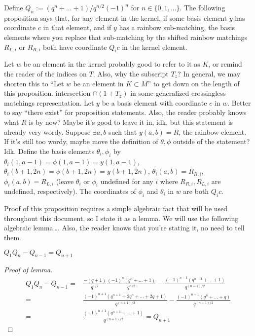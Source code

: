 \documentclass{amsart}
\begin{document}
Define $Q_n:=(q^n+...+1)/q^{n/2}(-1)^n$ for $n\in \{0,1,...\}$. The following proposition says that, for any element in the kernel, if some basis element $y$ has coordinate $c$ in that element, and if $y$ has a rainbow sub-matching, the basis elements where you replace that sub-matching by the shifted rainbow matchings $R_{L,i}$ or $R_{R,i}$ both have coordinate $Q_ic$ in the kernel element.

\begin{proposition}
  Let $w$ be an element in the kernel 
  {\color{magenta} probably good to refer to it as $K$, or remind the reader of the indices on $T$. Also, why the subscript $T_z$?
  In general, we may shorten this to ``Let $w$ be an element in $K \subset M$'' to get down on the length of this proposition.
}
  intersection $\cap (1+T_z)$ in some generalized crossingless matchings representation. Let $y$ be a basis element with coordinate $c$ in $w$. 
  {\color{magenta} Better to say ``there exist'' for proposition statements.
  Also, the reader probably knows what $R$ is by now? Maybe it's good to leave it in, idk, but this statement is already very wordy.
}
  Suppose $\exists a,b$ such that $y(a,b)=R$, the rainbow element. 
  {\color{magenta} If it's still too wordy, maybe move the definition of $\theta,\phi$ outside of the statement? Idk.}
  Define the basis elements $\theta_i,\phi_i$ by $\theta_i(1,a-1)=\phi(1,a-1)=y(1,a-1)$, $\theta_i(b+1,2n)=\phi(b+1,2n)=y(b+1,2n)$, $\theta_i(a,b)=R_{R,i}$, $\phi_i(a,b)=R_{L,i}$ (leave $\theta_i$ or $\phi_i$ undefined for any $i$ where $R_{R,i},R_{L,i}$ are undefined, respectively). The coordinates of $\phi_i$ and $\theta_i$ in $w$ are both $Q_ic$.
	
	\label{shifted rainbow coeffs}
\end{proposition}

Proof of this proposition requires a simple algebraic fact that will be used throughout this document, so I state it as a lemma.
{\color{magenta}We will use the following algebraic lemma\ldots.
Also, the reader knows that you're stating it, no need to tell them.
}

\begin{lemma}
	$Q_1Q_n-Q_{n-1}=Q_{n+1}$
	
	\label{Q alg}
\end{lemma}

\begin{proof}[Proof of lemma]
\begin{align*}
Q_1Q_n-Q_{n-1}=&\frac{-(q+1)}{q^{1/2}}\frac{(-1)^n(q^n+...+1)}{q^{n/2}}-\frac{(-1)^{n-1}(q^{n-1}+...+1)}{q^{(n-1)/2}}\\
=&\frac{(-1)^{n+1}(q^{n+1}+2q^n+...+2q+1)}{q^{(n+1)/2}}-\frac{(-1)^{n+1}(q^n+...+q)}{q^{(n+1)/2}}\\
=&\frac{(-1)^{n+1}(q^{n+1}+...+1)}{q^{(n+1)/2}}=Q_{n+1}
\end{align*}
\end{proof}
\end{document}
